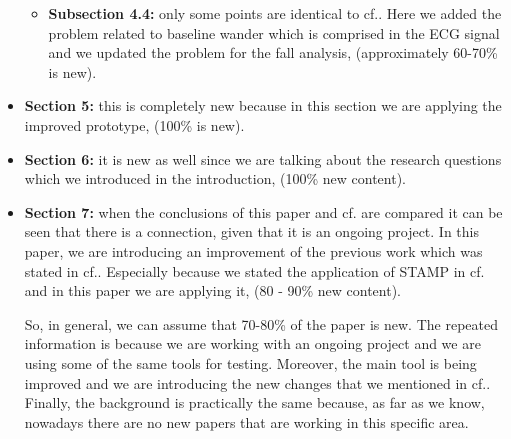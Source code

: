 \documentclass[parskip]{scrartcl}
\begin{document}
\begin{itemize}
\begin{itemize}
		\item  \textbf{Subsection 4.4:} only some points are identical to cf.\cite{LorenaFall}. Here we added the problem related to baseline wander which is comprised in the ECG signal and we updated the problem for the fall analysis, (approximately 60-70\% is new).
	\end{itemize}
	\item \textbf{Section 5:} this is completely new because in this section we are applying the improved prototype, (100\% is new).
	\item \textbf{Section 6:} it is new as well since we are talking about the research questions which we introduced in the introduction, (100\% new content).
	\item \textbf{Section 7:} when the conclusions of this paper and cf.\cite{LorenaFall} are compared it can be seen that there is a connection, given that it is an ongoing project. In this paper, we are introducing an improvement of the previous work which was stated in cf.\cite{LorenaFall}. Especially because we stated the application of STAMP in cf.\cite{LorenaFall} and in this paper we are applying it, (80 - 90\% new content).
	
	So, in general, we can assume that 70-80\% of the paper is new. The repeated information is because we are working with an ongoing project and we are using some of the same tools for testing. Moreover, the main tool is being improved and we are introducing the new changes that we mentioned in cf.\cite{LorenaFall}. Finally, the background is practically the same because, as far as we know, nowadays there are no new papers that are working in this specific area.
	
	
	
	
\end{itemize}



\end{document}

